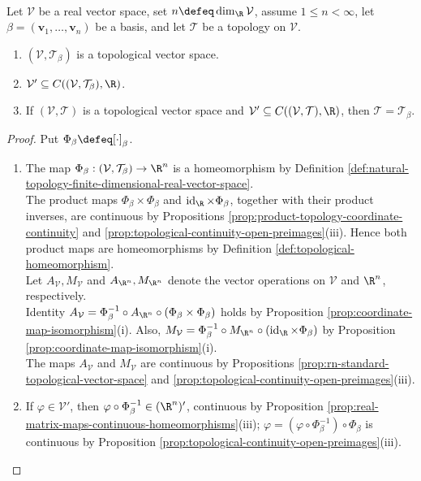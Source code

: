 \begin{theorem} \label{thm:natural-topology-characterization} \\
Let $\mathcal{V}$ be a real vector space, set $n\defeq\dim_{\R}\mathcal{V}$, assume $1\leq n<\infty$, let $\beta=(\mathbf{v}_1,\ldots,\mathbf{v}_n)$ be a basis, and let $\mathcal{T}$ be a topology on $\mathcal{V}$.
\begin{enumerate}[label=(\roman*)]
\setlength{\itemsep}{0pt}
\item $(\mathcal{V},\mathcal{T}_{\beta})$ is a topological vector space.
\item $\mathcal{V}'\subseteq C((\mathcal{V},\mathcal{T}_{\beta}),\R)$.
\item If $(\mathcal{V},\mathcal{T})$ is a topological vector space and $\mathcal{V}'\subseteq C((\mathcal{V},\mathcal{T}),\R)$, then $\mathcal{T}=\mathcal{T}_{\beta}$.
\end{enumerate}
\begin{proof}
Put $\Phi_{\beta}\defeq[\cdot]_{\beta}$.
\begin{enumerate}[label=(\roman*)]
\setlength{\itemsep}{0pt}
\item The map $\Phi_{\beta}:(\mathcal{V},\mathcal{T}_{\beta})\to\R^n$ is a homeomorphism by Definition \ref{def:natural-topology-finite-dimensional-real-vector-space}.\\
The product maps $\Phi_{\beta}\times\Phi_{\beta}$ and $\operatorname{id}_{\R}\times\Phi_{\beta}$, together with their product inverses, are continuous by Propositions \ref{prop:product-topology-coordinate-continuity} and \ref{prop:topological-continuity-open-preimages}(iii). Hence both product maps are homeomorphisms by Definition \ref{def:topological-homeomorphism}.\\
Let $A_{\mathcal{V}},M_{\mathcal{V}}$ and $A_{\R^n},M_{\R^n}$ denote the vector operations on $\mathcal{V}$ and $\R^n$, respectively.\\
Identity $A_{\mathcal{V}}=\Phi_{\beta}^{-1}\circ A_{\R^n}\circ(\Phi_{\beta}\times\Phi_{\beta})$ holds by Proposition \ref{prop:coordinate-map-isomorphism}(i). Also, $M_{\mathcal{V}}=\Phi_{\beta}^{-1}\circ M_{\R^n}\circ(\operatorname{id}_{\R}\times\Phi_{\beta})$ by Proposition \ref{prop:coordinate-map-isomorphism}(i).\\
The maps $A_{\mathcal{V}}$ and $M_{\mathcal{V}}$ are continuous by Propositions \ref{prop:rn-standard-topological-vector-space} and \ref{prop:topological-continuity-open-preimages}(iii).
\item If $\varphi\in\mathcal{V}'$, then $\varphi\circ\Phi_{\beta}^{-1}\in(\R^n)'$,  continuous by Proposition \ref{prop:real-matrix-maps-continuous-homeomorphisms}(iii); $\varphi=(\varphi\circ\Phi_{\beta}^{-1})\circ\Phi_{\beta}$ is continuous by Proposition \ref{prop:topological-continuity-open-preimages}(iii).

\end{enumerate}
\end{proof}
\end{theorem}
